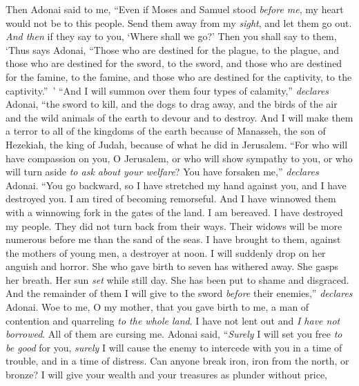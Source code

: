 \begin{biblechapter} %
 Then Adonai said to me, “Even if Moses and Samuel stood \textit{before me}, my heart would not be to this people. Send them away from my \textit{sight}, and let them go out.
\verse \textit{And then} if they say to you, ‘Where shall we go?’ Then you shall say to them, ‘Thus says Adonai, “Those who are destined for the plague, to the plague, 
and those who are destined for the sword, to the sword, 
and those who are destined for the famine, to the famine, 
and those who are destined for the captivity, to the captivity.” ’
\verse “And I will summon over them four types of calamity,” \textit{declares} Adonai, “the sword to kill, and the dogs to drag away, and the birds of the air and the wild animals of the earth to devour and to destroy.
\verse And I will make them a terror to all of the kingdoms of the earth because of Manasseh, the son of Hezekiah, the king of Judah, because of what he did in Jerusalem.
\verse “For who will have compassion on you, O Jerusalem, 
or who will show sympathy to you, 
or who will turn aside \textit{to ask about your welfare}?
\verse You have forsaken me,” \textit{declares} Adonai. 
“You go backward, so I have stretched my hand against you, 
and I have destroyed you. 
I am tired of becoming remorseful.
\verse And I have winnowed them with a winnowing fork in the gates of the land. 
I am bereaved. 
I have destroyed my people. 
They did not turn back from their ways.
\verse Their widows will be more numerous before me than the sand of the seas. 
I have brought to them, against the mothers of young men, 
a destroyer at noon. 
I will suddenly drop on her anguish and horror.
\verse She who gave birth to seven has withered away. 
She gasps her breath. 
Her sun \textit{set} while still day. 
She has been put to shame and disgraced. 
And the remainder of them I will give to the sword 
\textit{before} their enemies,” \textit{declares} Adonai.
 Woe to me, O my mother, that you gave birth to me, 
a man of contention and quarreling \textit{to the whole land}. 
I have not lent out and \textit{I have not borrowed}. 
All of them are cursing me.
\verse Adonai said,
\verse “\textit{Surely} I will set you free \textit{to be good} for you, 
\textit{surely} I will cause the enemy to intercede with you 
in a time of trouble, 
and in a time of distress.
\verse Can anyone break iron, 
iron from the north, or bronze?
\verse I will give your wealth and your treasures 
as plunder without price, 

\end{biblechapter}
